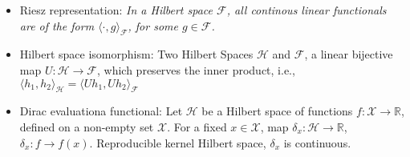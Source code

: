 \documentclass[12pt, letterpaper]{article}
\begin{document}
\begin{itemize}
	\item Riesz representation: \textit{In a Hilbert space ${\mathcal{F}}$, all continous linear functionals are of the form ${\langle \cdot, g \rangle}_{\mathcal{F}}$, for some $g \in \mathcal{F}$.}
	\item Hilbert space isomorphism: Two Hilbert Spaces $\mathcal{H}$ and $\mathcal{F}$, a linear bijective map $U : \mathcal{H} \rightarrow \mathcal{F}$, which preserves the inner product, i.e., 
	${\langle h_1, h_2 \rangle}_{\mathcal{H}} = {\langle Uh_1, Uh_2 \rangle}_{\mathcal{F}}$
	\item Dirac evaluationa functional: Let $\mathcal{H}$ be a Hilbert space of functions $f : \mathcal{X} \rightarrow \mathbb{R}$, defined on a non-empty set $\mathcal{X}$. For a fixed $x \in \mathcal{X}$, map $\delta_x : \mathcal{H} \rightarrow \mathbb{R}$, $\delta_x : f \rightarrow f(x)$. Reproducible kernel Hilbert space, $\delta_x$ is continuous.
\end{itemize}
\end{document}
